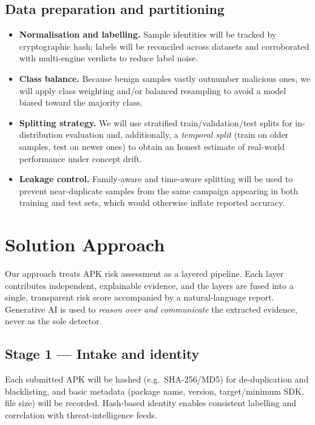 \documentclass[11pt,a4paper]{article}
\begin{document}
\subsection{Data preparation and partitioning}
\begin{itemize}
  \item \textbf{Normalisation and labelling.} Sample identities will be tracked by
  cryptographic hash; labels will be reconciled across datasets and corroborated with
  multi-engine verdicts to reduce label noise.
  \item \textbf{Class balance.} Because benign samples vastly outnumber malicious ones,
  we will apply class weighting and/or balanced resampling to avoid a model biased toward
  the majority class.
  \item \textbf{Splitting strategy.} We will use stratified train/validation/test splits
  for in-distribution evaluation and, additionally, a \emph{temporal split} (train on
  older samples, test on newer ones) to obtain an honest estimate of real-world
  performance under concept drift.
  \item \textbf{Leakage control.} Family-aware and time-aware splitting will be used to
  prevent near-duplicate samples from the same campaign appearing in both training and
  test sets, which would otherwise inflate reported accuracy.
\end{itemize}

\section{Solution Approach}
Our approach treats APK risk assessment as a layered pipeline. Each layer contributes
independent, explainable evidence, and the layers are fused into a single, transparent
risk score accompanied by a natural-language report. Generative AI is used to
\emph{reason over and communicate} the extracted evidence, never as the sole detector.

\subsection{Stage 1 --- Intake and identity}
Each submitted APK will be hashed (e.g.\ SHA-256/MD5) for de-duplication and blacklisting,
and basic metadata (package name, version, target/minimum SDK, file size) will be
recorded. Hash-based identity enables consistent labelling and correlation with
threat-intelligence feeds.
\end{document}
